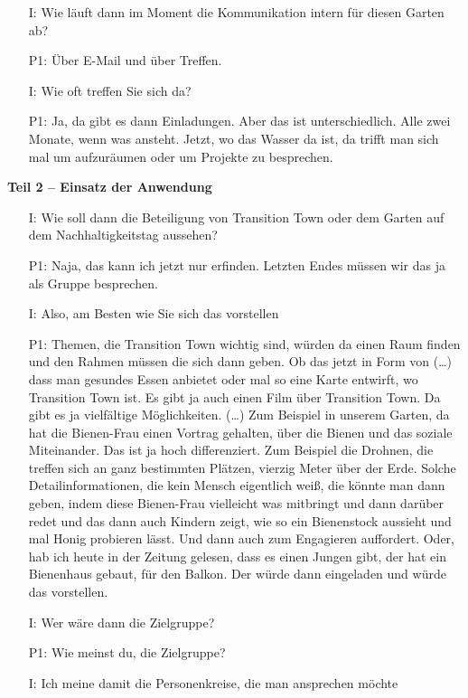 \begin{itemize}
	\item[I:] Wie l{\"a}uft dann im Moment die Kommunikation intern f{\"u}r diesen Garten ab?
	\item[P1:] {\"U}ber E-Mail und {\"u}ber Treffen.
	\item[I:] Wie oft treffen Sie sich da?
	\item[P1:] Ja, da gibt es dann Einladungen. Aber das ist unterschiedlich. Alle zwei Monate, wenn was ansteht. Jetzt, wo das Wasser da ist, da trifft man sich mal um aufzur{\"a}umen oder um Projekte zu besprechen.	
\end{itemize}

\textbf{Teil 2 -- Einsatz der Anwendung}
\begin{itemize}
	\item[I:] Wie soll dann die Beteiligung von Transition Town oder dem Garten auf dem Nachhaltigkeitstag aussehen?
	\item[P1:] Naja, das kann ich jetzt nur erfinden. Letzten Endes m{\"u}ssen wir das ja als Gruppe besprechen.
	\item[I:] Also, am Besten wie Sie sich das vorstellen
	\item[P1:] Themen, die Transition Town wichtig sind, w{\"u}rden da einen Raum finden und den Rahmen m{\"u}ssen die sich dann geben. Ob das jetzt in Form von (\dots) dass man gesundes Essen anbietet oder mal so eine Karte entwirft, wo Transition Town ist. Es gibt ja auch einen Film {\"u}ber Transition Town. Da gibt es ja vielf{\"a}ltige M{\"o}glichkeiten. (\dots) Zum Beispiel in unserem Garten, da hat die Bienen-Frau einen Vortrag gehalten, {\"u}ber die Bienen und das soziale Miteinander. Das ist ja hoch differenziert. Zum Beispiel die Drohnen, die treffen sich an ganz bestimmten Pl{\"a}tzen, vierzig Meter {\"u}ber der Erde. Solche Detailinformationen, die kein Mensch eigentlich wei{\ss}, die k{\"o}nnte man dann geben, indem diese Bienen-Frau vielleicht was mitbringt und dann dar{\"u}ber redet und das dann auch Kindern zeigt, wie so ein Bienenstock aussieht und mal Honig probieren l{\"a}sst. Und dann auch zum Engagieren auffordert. Oder, hab ich heute in der Zeitung gelesen, dass es einen Jungen gibt, der hat ein Bienenhaus gebaut, f{\"u}r den Balkon. Der w{\"u}rde dann eingeladen und w{\"u}rde das vorstellen.
	\item[I:] Wer w{\"a}re dann die Zielgruppe? 
	\item[P1:] Wie meinst du, die Zielgruppe?
	\item[I:] Ich meine damit die Personenkreise, die man ansprechen m{\"o}chte

\end{itemize}
